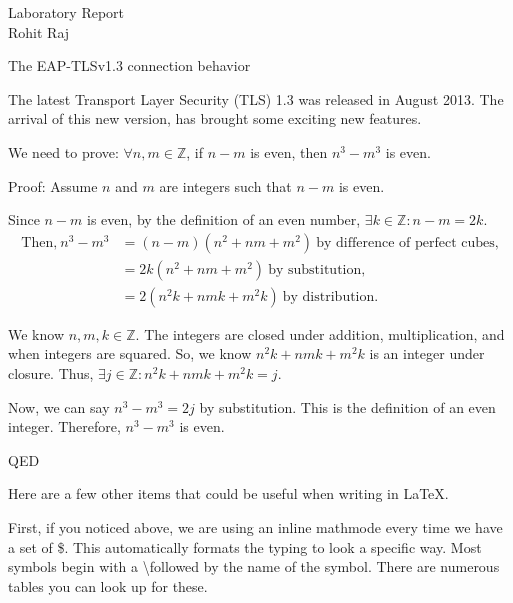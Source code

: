 \documentclass[12pt]{article}
\begin{document}

\begin{center}
    Laboratory Report \\
    Rohit Raj
\end{center}

\begin{center}
    \Large The EAP-TLSv1.3 connection behavior
\end{center}

The latest Transport Layer Security (TLS) 1.3 was released in August 2013. The arrival of this new version, has brought some exciting new features. 

  
We need to prove: $\forall n,m \in \mathbb{Z}$, if $n-m$ is even, then $n^3 - m^3$ is even.
    
    
Proof: Assume $n$ and $m$ are integers such that $n-m$ is even.
    
Since $n-m$ is even, by the definition of an even number, $\exists k \in \mathbb{Z}: n-m = 2k$.
    \begin{align*}
        \textrm{Then,} \ n^3 - m^3 &= (n-m)(n^2 + nm + m^2) \ \textrm{by difference of perfect cubes,} \\
        &= 2k(n^2 + nm + m^2) \ \textrm{by substitution,} \\
        &= 2(n^2k + nmk + m^2k) \ \textrm{by distribution.}
    \end{align*}
    
We know $n, m, k \in \mathbb{Z}$.  The integers are closed under addition, multiplication, and when integers are squared.  So, we know $n^2k + nmk + m^2k$ is an integer under closure.  Thus, $\exists j \in \mathbb{Z}: n^2k + nmk + m^2k = j$.
    
Now, we can say $n^3-m^3 = 2j$ by substitution. This is the definition of an even integer.  Therefore, $n^3-m^3$ is even.

\noindent QED
   
\begin{center}
    \Large Here are a few other items that could be useful when writing in \LaTeX. \normalsize
\end{center}  

First, if you noticed above, we are using an inline mathmode every time we have a set of \$.  This automatically formats the typing to look a specific way.  Most symbols begin with a \textbackslash followed by the name of the symbol.  There are numerous tables you can look up for these.
\end{document}

